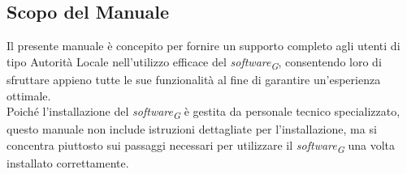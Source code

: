 \subsection{Scopo del Manuale}
Il presente manuale è concepito per fornire un supporto completo agli utenti di tipo Autorità Locale nell'utilizzo efficace del \textit{software}\textsubscript{\textit{G}}, consentendo loro di sfruttare appieno tutte le sue funzionalità al fine di garantire un'esperienza ottimale.\\
Poiché l'installazione del \textit{software}\textsubscript{\textit{G}} è gestita da personale tecnico specializzato, questo manuale non include istruzioni dettagliate per l'installazione, ma si concentra piuttosto sui passaggi necessari per utilizzare il \textit{software}\textsubscript{\textit{G}} una volta installato correttamente.

